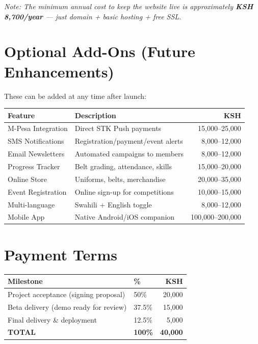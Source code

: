 \documentclass[12pt,a4paper]{article}
\begin{document}
\begin{small}
\textit{Note: The minimum annual cost to keep the website live is approximately \textbf{KSH 8,700/year} --- just domain + basic hosting + free SSL.}
\end{small}

\section{Optional Add-Ons (Future Enhancements)}

These can be added at any time after launch:

\begin{longtable}{p{4cm}p{5.5cm}r}
    \toprule
    \textbf{Feature} & \textbf{Description} & \textbf{KSH} \\
    \midrule
    \endfirsthead
    M-Pesa Integration & Direct STK Push payments & 15,000--25,000 \\
    SMS Notifications & Registration/payment/event alerts & 8,000--12,000 \\
    Email Newsletters & Automated campaigns to members & 8,000--12,000 \\
    Progress Tracker & Belt grading, attendance, skills & 15,000--20,000 \\
    Online Store & Uniforms, belts, merchandise & 20,000--35,000 \\
    Event Registration & Online sign-up for competitions & 10,000--15,000 \\
    Multi-language & Swahili + English toggle & 8,000--12,000 \\
    Mobile App & Native Android/iOS companion & 100,000--200,000 \\
    \bottomrule
\end{longtable}

\section{Payment Terms}

\begin{tabularx}{\textwidth}{Xlr}
    \toprule
    \textbf{Milestone} & \textbf{\%} & \textbf{KSH} \\
    \midrule
    Project acceptance (signing proposal) & 50\% & 20,000 \\
    Beta delivery (demo ready for review) & 37.5\% & 15,000 \\
    Final delivery \& deployment & 12.5\% & 5,000 \\
    \midrule
    \textbf{TOTAL} & \textbf{100\%} & \textbf{40,000} \\
    \bottomrule
\end{tabularx}
\end{document}
